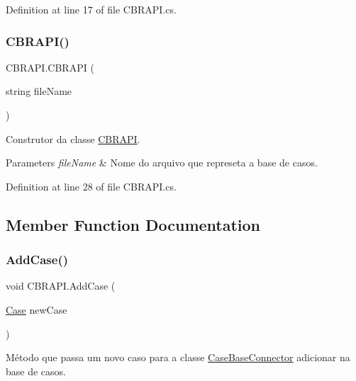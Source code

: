 Definition at line 17 of file C\+B\+R\+A\+P\+I.\+cs.

\hypertarget{class_c_b_r_a_p_i_a9e521eefe067de857bcc86990d64256e}{}\label{class_c_b_r_a_p_i_a9e521eefe067de857bcc86990d64256e} 
\subsubsection{\texorpdfstring{C\+B\+R\+A\+P\+I()}{CBRAPI()}\hspace{0.1cm}{\footnotesize\ttfamily [2/2]}}
{\footnotesize\ttfamily C\+B\+R\+A\+P\+I.\+C\+B\+R\+A\+PI (\begin{DoxyParamCaption}\item[{string}]{file\+Name }\end{DoxyParamCaption})}



Construtor da classe \hyperlink{class_c_b_r_a_p_i}{C\+B\+R\+A\+PI}. 


\begin{DoxyParams}{Parameters}
{\em file\+Name} & Nome do arquivo que represeta a base de casos.\\
\hline
\end{DoxyParams}


Definition at line 28 of file C\+B\+R\+A\+P\+I.\+cs.



\subsection{Member Function Documentation}
\hypertarget{class_c_b_r_a_p_i_a887ddacca4fd9f79d20f8b392b3e8a8e}{}\label{class_c_b_r_a_p_i_a887ddacca4fd9f79d20f8b392b3e8a8e} 
\subsubsection{\texorpdfstring{Add\+Case()}{AddCase()}}
{\footnotesize\ttfamily void C\+B\+R\+A\+P\+I.\+Add\+Case (\begin{DoxyParamCaption}\item[{\hyperlink{class_case}{Case}}]{new\+Case }\end{DoxyParamCaption})}



Método que passa um novo caso para a classe \hyperlink{class_case_base_connector}{Case\+Base\+Connector} adicionar na base de casos. 


